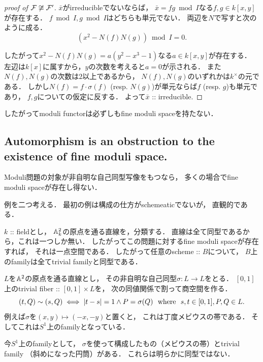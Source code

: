 \documentclass[a4paper]{jsarticle}
\newcommand{\famF}{\mathcal{F}}
\begin{document}
\begin{proof}[proof of $\famF \not \iso \famF'$]
        $\bar{x}$がirreducibleでないならば，
        $\bar{x}=fg \bmod I$なる$f,g \in k[x,y]$が存在する．
        $f \bmod I, g \bmod I$はどちらも単元でない．
        両辺を$N$で写すと次のように成る．
        \[ (x^2-N(f)N(g)) \bmod I=0. \]

        したがって$x^2-N(f)N(g)=a(y^2-x^3-1)$なる$a \in k[x,y]$が存在する．
        左辺は$k[x]$に属すから，$y$の次数を考えると$a=0$が示される．
        また$N(f), N(g)$の次数は$2$以上であるから，
        $N(f), N(g)$のいずれかは$k^{\times}$の元である．
        しかし$N(f)=f \cdot \sigma(f)$ (resp. $N(g)$)が単元ならば$f$ (resp. $g$)も単元であり，
        $f,g$についての仮定に反する．
        よって$\bar{x}$ :: irreducible.
    \end{proof}

    したがってmoduli functorは必ずしもfine moduli spaceを持たない．

    \subsection{Automorphism is an obstruction to the existence of fine moduli space.}
    Moduli問題の対象が非自明な自己同型写像をもつなら，
    多くの場合でfine moduli spaceが存在し得ない．

    例を二つ考える．
    最初の例は構成の仕方がschemeaticでないが，
    直観的である．
    \begin{Example}
        $k$ :: fieldとし，
        $\mathbb{A}^2_k$の原点を通る直線を，分類する．
        直線は全て同型であるから，これは一つしか無い．
        したがってこの問題に対するfine moduli spaceが存在すれば，
        それは一点空間である．
        したがって任意のscheme :: $B$について，
        $B$上のfamilyは全てtrivial familyと同型である．
        
        $L$を$\mathbb{A}^2$の原点を通る直線とし，
        その非自明な自己同型$\sigma: L \to L$をとる．
        $[0,1]$上のtrivial fiber :: $[0,1] \times L$を，
        次の同値関係で割って商空間を作る．
        \[ (t, Q) \sim (s, Q) \iff |t-s|=1 \land P=\sigma(Q) ~~\text{where}~~ s,t \in [0,1], P,Q \in L. \]
        例えば$\sigma$を$(x,y) \mapsto (-x,-y)$と置くと，
        これは丁度メビウスの帯である．
        そしてこれは$S^1$上のfamilyとなっている．

        今$S^1$上のfamilyとして，
        $\sigma$を使って構成したもの（メビウスの帯）とtrivial family （斜めになった円筒）がある．
        これらは明らかに同型ではない．
    \end{Example}
\end{document}
